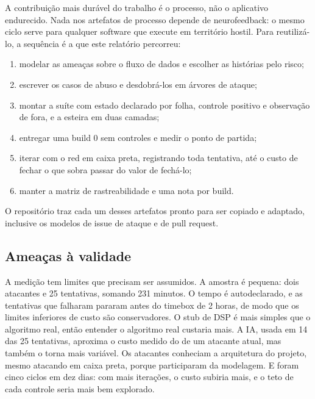 A contribuição mais durável do trabalho é o processo, não o aplicativo endurecido. Nada nos artefatos de processo depende de neurofeedback: o mesmo ciclo serve para qualquer software que execute em território hostil. Para reutilizá-lo, a sequência é a que este relatório percorreu:
\begin{enumerate}
\item modelar as ameaças sobre o fluxo de dados e escolher as histórias pelo risco;
\item escrever os casos de abuso e desdobrá-los em árvores de ataque;
\item montar a suíte com estado declarado por folha, controle positivo e observação de fora, e a esteira em duas camadas;
\item entregar uma build 0 sem controles e medir o ponto de partida;
\item iterar com o red em caixa preta, registrando toda tentativa, até o custo de fechar o que sobra passar do valor de fechá-lo;
\item manter a matriz de rastreabilidade e uma nota por build.
\end{enumerate}
O repositório \parencite{repo} traz cada um desses artefatos pronto para ser copiado e adaptado, inclusive os modelos de issue de ataque e de pull request.

\subsection{Ameaças à validade}

A medição tem limites que precisam ser assumidos. A amostra é pequena: dois atacantes e 25 tentativas, somando 231 minutos. O tempo é autodeclarado, e as tentativas que falharam pararam antes do timebox de 2 horas, de modo que os limites inferiores de custo são conservadores. O stub de DSP é mais simples que o algoritmo real, então entender o algoritmo real custaria mais. A IA, usada em 14 das 25 tentativas, aproxima o custo medido do de um atacante atual, mas também o torna mais variável. Os atacantes conheciam a arquitetura do projeto, mesmo atacando em caixa preta, porque participaram da modelagem. E foram cinco ciclos em dez dias: com mais iterações, o custo subiria mais, e o teto de cada controle seria mais bem explorado.

